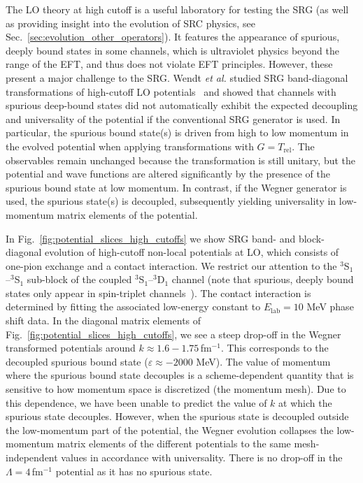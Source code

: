 \documentclass[10pt,aps,prc,floatfix,twocolumn,nofootinbib]{revtex4-1}
\newcommand{\Trel}{\ensuremath{T_{\textrm{rel}}}}
\begin{document}
The LO theory at high cutoff is a useful laboratory for testing the SRG (as well as providing insight into the evolution of SRC physics, see Sec.~\ref{sec:evolution_other_operators}).
It features the appearance of spurious, deeply bound states in some channels, which is ultraviolet physics beyond the range of the EFT, and thus does not violate EFT principles.
However, these present a major challenge to the SRG.
Wendt \textit{et al.} studied SRG band-diagonal transformations of high-cutoff LO potentials~\cite{Wendt:2011qj} and showed that channels with spurious deep-bound states did not automatically exhibit the expected decoupling and universality of the potential if the conventional SRG generator is used.
In particular, the spurious bound state(s) is driven from high to low momentum in the evolved potential when applying transformations with $G=\Trel$.
The observables remain unchanged because the transformation is still unitary, but the potential and wave functions are altered significantly by the presence of the spurious bound state at low momentum. 
In contrast, if the Wegner generator is used, the spurious state(s) is decoupled, subsequently yielding universality in low-momentum matrix elements of the potential.


In Fig.~\ref{fig:potential_slices_high_cutoffs} we show SRG band- and block-diagonal evolution of high-cutoff non-local potentials at LO, 
which consists of one-pion exchange and a contact interaction.
We restrict our attention to the $^3$S$_1$--$^3$S$_1$ sub-block of the coupled $^3$S$_1$--$^3$D$_1$ channel (note that spurious, deeply bound states only appear in spin-triplet channels~\cite{Nogga:2005hy}).
The contact interaction is determined by fitting the associated low-energy constant to $E_{\text{lab}}=10$ MeV phase shift data.
In the diagonal matrix elements of Fig.~\ref{fig:potential_slices_high_cutoffs}, we see a steep drop-off in the Wegner transformed potentials around $k \approx 1.6-1.75$\,fm$^{-1}$.
This corresponds to the decoupled spurious bound state ($\varepsilon \approx -2000$ MeV).
The value of momentum where the spurious bound state decouples is a scheme-dependent quantity that is sensitive to how momentum space is discretized (the momentum mesh).
Due to this dependence, we have been unable to predict the value of $k$ at which the spurious state decouples.
However, when the spurious state is decoupled outside the low-momentum part of the potential, the Wegner evolution collapses the low-momentum matrix elements of the different potentials to the same mesh-independent values in accordance with universality.
There is no drop-off in the $\Lambda=4$\,fm$^{-1}$ potential as it has no spurious state.
\end{document}
